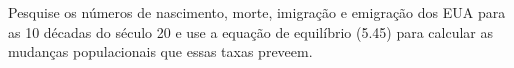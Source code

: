 Pesquise os números de nascimento, morte, imigração e emigração dos EUA para as 10 décadas do século 20 e use a equação de equilíbrio (5.45) para calcular as mudanças populacionais que essas taxas preveem.
